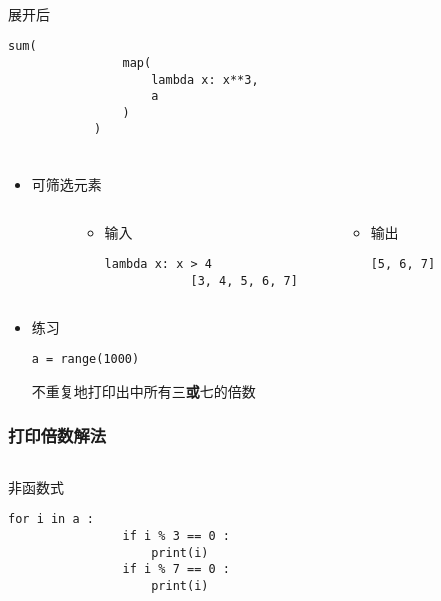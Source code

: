 \begin{CJK}{UTF8}{gbsn}
\begin{frame} [fragile]
\begin{columns}
\begin{column}[T]{.58\textwidth}
			\

			展开后
			\begin{lstlisting}[style=pythonstyle, gobble=12, texcl]
			sum(
				map(
					lambda x: x**3,
					a
				)
			)
			\end{lstlisting}
		\end{column}
	\end{columns}
\end{frame}

\begin{frame} [fragile]
	\frametitle{}
	\begin{itemize}
	\item {}可筛选元素
	\begin{columns}
		\begin{column}[T]{.1\textwidth}
		\end{column}
		\begin{column}[T]{.4\textwidth}
			\begin{itemize}
			\item 输入
			\begin{lstlisting}[style=pythonstyle, gobble=12, texcl]
			lambda x: x > 4
			[3, 4, 5, 6, 7]
			\end{lstlisting}
			\end{itemize}
		\end{column}
		\begin{column}[T]{.4\textwidth}
			\begin{itemize}
			\item 输出
			\begin{lstlisting}[style=pythonstyle, gobble=12, texcl]
			[5, 6, 7]
			\end{lstlisting}
			\end{itemize}
		\end{column}
		\begin{column}[T]{.1\textwidth}
		\end{column}
	\end{columns}
	\item 练习
		\begin{lstlisting}[style=pythonstyle, gobble=8, texcl]
		a = range(1000)
		\end{lstlisting}
		不重复地打印出中所有三\textbf{或}七的倍数
	\end{itemize}
\end{frame}

\begin{frame} [fragile]
	\frametitle{打印倍数解法}
	\begin{columns}
		\begin{column}[T]{.42\textwidth}
			非函数式
			\begin{lstlisting}[style=pythonstyle, gobble=12, texcl]
			for i in a :
				if i % 3 == 0 :
					print(i)
				if i % 7 == 0 :
					print(i)


\end{lstlisting}
\end{column}
\end{columns}
\end{frame}
\end{CJK}
